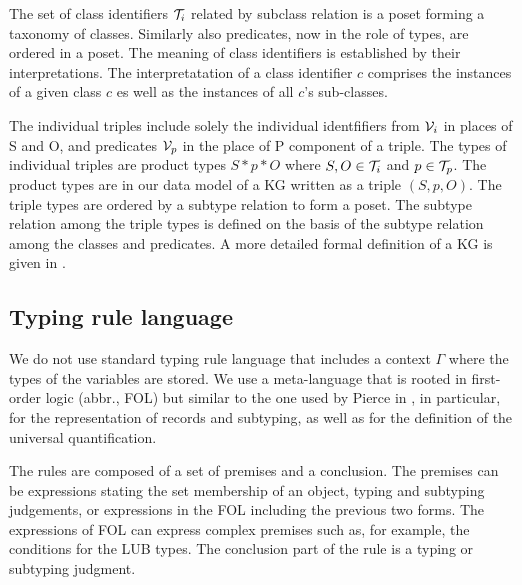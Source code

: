 \documentclass[runningheads]{llncs}
\newcommand{\V}{{\cal V}}
\newcommand{\T}{{\cal T}}
\newcommand{\memo}[1]{}
\begin{document}
The set of class identifiers $\T_i$ related by subclass relation is a
poset forming a taxonomy of classes. Similarly also predicates, now
in the role of types, are ordered in a poset. The meaning of class
identifiers is established by their interpretations. The
interpretatation of a class identifier $c$ comprises the instances of
a given class $c$ es well as the instances of all $c$'s sub-classes. 

The individual triples include solely the individual identfifiers from
$\V_i$ in places of S and O, and predicates $\V_p$ in the place of P
component of a triple. The types of individual triples are product
types $S*p*O$ where $S,O\in\T_i$ and $p\in\T_p$. The product types are
in our data model of a KG written as a triple $(S,p,O)$. The triple
types are ordered by a subtype relation to form a poset. The subtype
relation among the triple types is defined on the basis of the subtype
relation among the classes and predicates. A more detailed formal
definition of a KG is given in \cite{Savnik2025}.





\subsection{Typing rule language}

\memo{
In this paper we define typing of a data language used to represent an
ABOX \cite{Brachman2004KnowledgeRR} of a knowledge base given in a
form of a knowledge graph. The data language specifys the assertions
in the form of ground triples (ABOX) and the schema of assertions as
the types of triples (TBOX). The ground triples are the instances of
the triple types that altogether define the schema of a KG.}

We do not use standard typing rule language
\cite{Pierce2002,Hindley1997} that includes a context $\Gamma$ where
the types of the variables are stored. We use a meta-language that is
rooted in first-order logic (abbr., FOL) but similar to the one used
by Pierce in \cite{Pierce2002}, in particular, for the representation
of records and subtyping, as well as for the definition of the
universal quantification.

The rules are composed of a set of premises and a conclusion. The
premises can be expressions stating the set membership of an object,
typing and subtyping judgements, or expressions in the FOL including
the previous two forms. The expressions of FOL can express complex
premises such as, for example, the conditions for the LUB types. The
conclusion part of the rule is a typing or subtyping judgment.
\end{document}
